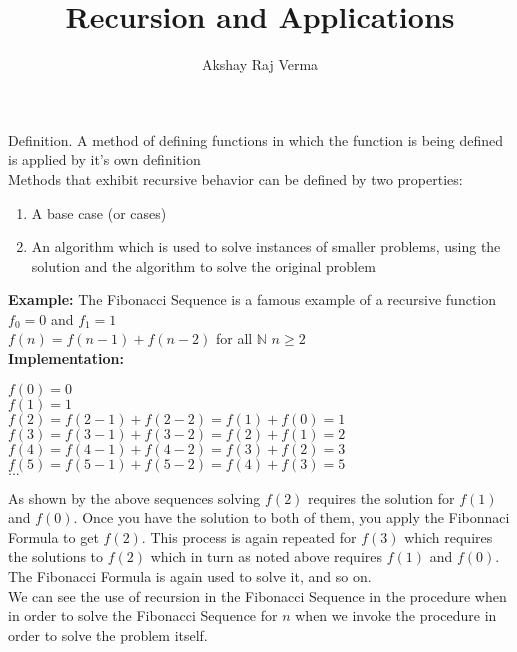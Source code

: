 \documentclass{article}
\begin{document}
\title{Recursion and Applications}
\author{Akshay Raj Verma}
\maketitle
{Definition.} A method of defining functions in which the function is being defined is applied by it's own definition
\\
Methods that exhibit recursive behavior can be defined by two properties: \\
\begin{enumerate}
	\item A base case (or cases)
	\item An algorithm which is used to solve instances of smaller problems, using the solution and the algorithm to solve the original problem
\end{enumerate}
{\bf Example:} The Fibonacci Sequence is a famous example of a recursive function\\
\hspace{10mm}{\bf Base Case:}  \hspace{10mm}$f_0=0$ and $f_1=1$
\\
\hspace{10mm}{\bf Formula:} \hspace{11mm} $f(n)=f(n-1)+f(n-2)$ for all $\mathbb{N}$ $ n \geq 2$
\\
{\bf Implementation:}
\\
\begin{center}
$f(0)=0$
\\
$f(1)=1$
\\
$f(2)=f(2-1)+f(2-2)=f(1)+f(0)=1$
\\
$f(3)=f(3-1)+f(3-2)=f(2)+f(1)=2$
\\
$f(4)=f(4-1)+f(4-2)=f(3)+f(2)=3$
\\
$f(5)=f(5-1)+f(5-2)=f(4)+f(3)=5$
\\
$...$
\\
\end{center}
As shown by the above sequences solving $f(2)$ requires the solution for $f(1)$ and $f(0)$.  Once you have the solution to both of them, you apply the Fibonnaci Formula to get $f(2)$.  This process is again repeated for $f(3)$ which requires the solutions to $f(2)$ which in turn as noted above requires $f(1)$ and $f(0)$.  The Fibonacci Formula is again used to solve it, and so on.  
\\
We can see the use of recursion in the Fibonacci Sequence in the procedure when in order to solve the Fibonacci Sequence for $n$ when we invoke the procedure in order to solve the problem itself.   
\end{document}
